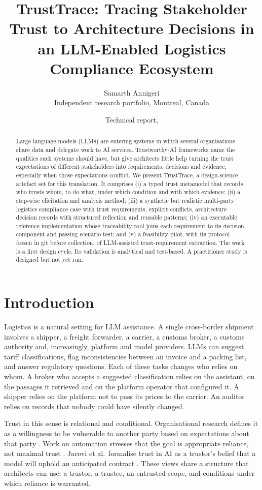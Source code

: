 \documentclass[10pt,twocolumn]{article}
\title{\textbf{TrustTrace: Tracing Stakeholder Trust to Architecture Decisions in an LLM-Enabled Logistics Compliance Ecosystem}}
\author{Samarth Annigeri\\Independent research portfolio, Montreal, Canada}
\date{Technical report, }
\begin{document}
\maketitle

\begin{abstract}
Large language models (LLMs) are entering systems in which several organisations share data and delegate work to AI services. Trustworthy-AI frameworks name the qualities such systems should have, but give architects little help turning the trust expectations of different stakeholders into requirements, decisions and evidence, especially when those expectations conflict. We present TrustTrace, a design-science artefact set for this translation. It comprises (i) a typed trust metamodel that records who trusts whom, to do what, under which condition and with which evidence; (ii) a step-wise elicitation and analysis method; (iii) a synthetic but realistic multi-party logistics compliance case with \NReq{} trust requirements, \NConflicts{} explicit conflicts, \NDecisions{} architecture decision records with structured reflection and \NPatterns{} reusable patterns; (iv) an executable reference implementation whose traceability tool joins each requirement to its decision, component and passing scenario test; and (v) a feasibility pilot, with its protocol frozen in git before collection, of LLM-assisted trust-requirement extraction.  The work is a first design cycle. Its validation is analytical and test-based. A practitioner study is designed but not yet run.
\end{abstract}

\section{Introduction}
Logistics is a natural setting for LLM assistance. A single cross-border shipment involves a shipper, a freight forwarder, a carrier, a customs broker, a customs authority and, increasingly, platform and model providers. LLMs can suggest tariff classifications, flag inconsistencies between an invoice and a packing list, and answer regulatory questions. Each of these tasks changes who relies on whom. A broker who accepts a suggested classification relies on the assistant, on the passages it retrieved and on the platform operator that configured it. A shipper relies on the platform not to pass its prices to the carrier. An auditor relies on records that nobody could have silently changed.

Trust in this sense is relational and conditional. Organisational research defines it as a willingness to be vulnerable to another party based on expectations about that party \cite{mayer1995}. Work on automation stresses that the goal is appropriate reliance, not maximal trust \cite{lee2004}. Jacovi et al.\ formalise trust in AI as a trustor's belief that a model will uphold an anticipated contract \cite{jacovi2021}. These views share a structure that architects can use: a trustor, a trustee, an entrusted scope, and conditions under which reliance is warranted.
\end{document}
